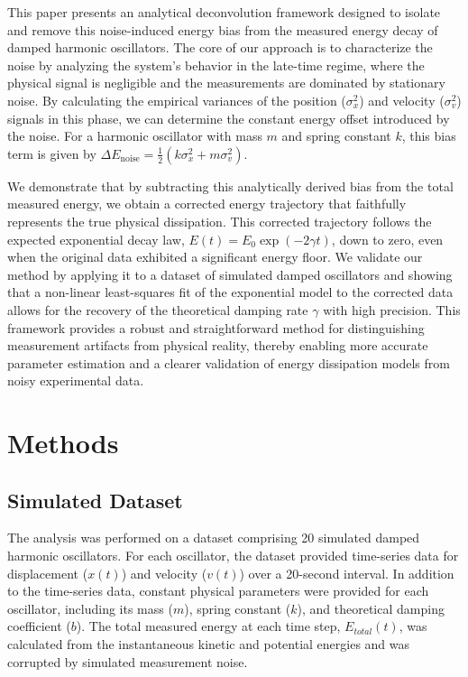 \documentclass[]{article}
\begin{document}
This paper presents an analytical deconvolution framework designed to isolate and remove this noise-induced energy bias from the measured energy decay of damped harmonic oscillators. The core of our approach is to characterize the noise by analyzing the system's behavior in the late-time regime, where the physical signal is negligible and the measurements are dominated by stationary noise. By calculating the empirical variances of the position ($\sigma_x^2$) and velocity ($\sigma_v^2$) signals in this phase, we can determine the constant energy offset introduced by the noise. For a harmonic oscillator with mass $m$ and spring constant $k$, this bias term is given by $\Delta E_{\text{noise}} = \frac{1}{2}(k\sigma_x^2 + m\sigma_v^2)$.

We demonstrate that by subtracting this analytically derived bias from the total measured energy, we obtain a corrected energy trajectory that faithfully represents the true physical dissipation. This corrected trajectory follows the expected exponential decay law, $E(t) = E_0 \exp(-2\gamma t)$, down to zero, even when the original data exhibited a significant energy floor. We validate our method by applying it to a dataset of simulated damped oscillators and showing that a non-linear least-squares fit of the exponential model to the corrected data allows for the recovery of the theoretical damping rate $\gamma$ with high precision. This framework provides a robust and straightforward method for distinguishing measurement artifacts from physical reality, thereby enabling more accurate parameter estimation and a clearer validation of energy dissipation models from noisy experimental data.

\section{Methods}
\label{sec:methods}
\subsection{Simulated Dataset}
The analysis was performed on a dataset comprising 20 simulated damped harmonic oscillators. For each oscillator, the dataset provided time-series data for displacement ($x(t)$) and velocity ($v(t)$) over a 20-second interval. In addition to the time-series data, constant physical parameters were provided for each oscillator, including its mass ($m$), spring constant ($k$), and theoretical damping coefficient ($b$). The total measured energy at each time step, $E_{total}(t)$, was calculated from the instantaneous kinetic and potential energies and was corrupted by simulated measurement noise.
\end{document}
